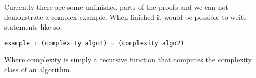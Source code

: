 Currently there are some unfinished parts of the proofs and we can not demonstrate
a complex example. When finished it would be possible to write statements like so:

\begin{verbatim}
example : (complexity algo1) = (complexity algo2)
\end{verbatim}

Where complexity is simply a recursive function that computes the complexity
class of an algorithm.
